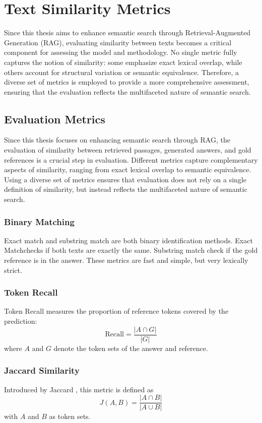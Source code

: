 \section{Text Similarity Metrics}
\label{sec:text-similarity-metrics}
Since this thesis aims to enhance semantic search through Retrieval-Augmented Generation (\gls{RAG}), 
evaluating similarity between texts becomes a critical component for assessing the model and methodology. 
No single metric fully captures the notion of similarity: some emphasize exact lexical overlap, 
while others account for structural variation or semantic equivalence. 
Therefore, a diverse set of metrics is employed to provide a more comprehensive assessment, 
ensuring that the evaluation reflects the multifaceted nature of semantic search.

\subsection{Evaluation Metrics}

Since this thesis focuses on enhancing semantic search through \gls{RAG}, the evaluation of similarity between retrieved passages, generated answers, and gold references is a crucial step in evaluation. Different metrics capture complementary aspects of similarity, ranging from exact lexical overlap to semantic equivalence. Using a diverse set of metrics ensures that evaluation does not rely on a single definition of similarity, but instead reflects the multifaceted nature of semantic search.
\subsubsection{Binary Matching}
Exact match and substring match are both binary identification methods. Exact Matchchecks if both texts are exactly the same. Substring match check if the gold reference is in the answer. These metrics are fast and simple, but very lexically strict.

\subsubsection{Token Recall} 
Token Recall measures the proportion of reference tokens covered by the prediction:
\[
\text{Recall} = \frac{|A \cap G|}{|G|}
\]
where \(A\) and \(G\) denote the token sets of the answer and reference.  

\subsubsection{Jaccard Similarity} 
Introduced by Jaccard \cite{jaccard1901distribution}, this metric is defined as
\[
J(A,B) = \frac{|A \cap B|}{|A \cup B|}
\]
with \(A\) and \(B\) as token sets.  


